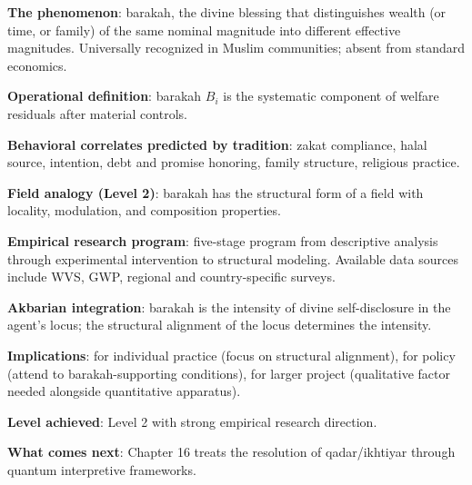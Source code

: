 \begin{summarybox}
\textbf{The phenomenon}: barakah, the divine blessing that
distinguishes wealth (or time, or family) of the same nominal
magnitude into different effective magnitudes. Universally
recognized in Muslim communities; absent from standard economics.

\textbf{Operational definition}: barakah $B_i$ is the systematic
component of welfare residuals after material controls.

\textbf{Behavioral correlates predicted by tradition}: zakat
compliance, halal source, intention, debt and promise honoring,
family structure, religious practice.

\textbf{Field analogy (Level 2)}: barakah has the structural form
of a field with locality, modulation, and composition properties.

\textbf{Empirical research program}: five-stage program from
descriptive analysis through experimental intervention to
structural modeling. Available data sources include WVS, GWP,
regional and country-specific surveys.

\textbf{Akbarian integration}: barakah is the intensity of divine
self-disclosure in the agent's locus; the structural alignment of
the locus determines the intensity.

\textbf{Implications}: for individual practice (focus on structural
alignment), for policy (attend to barakah-supporting conditions),
for larger project (qualitative factor needed alongside
quantitative apparatus).

\textbf{Level achieved}: Level 2 with strong empirical research
direction.

\textbf{What comes next}: Chapter 16 treats the resolution of
qadar/ikhtiyar through quantum interpretive frameworks.
\end{summarybox}

\cleardoublepage
